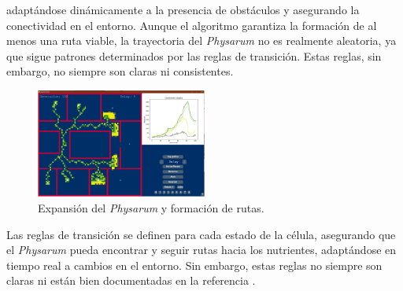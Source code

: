         adapt\'andose din\'amicamente a la presencia de obst\'aculos y asegurando la conectividad en el entorno. Aunque el 
        algoritmo garantiza la formaci\'on de al menos una ruta viable, la trayectoria del \textit{Physarum} no es 
        realmente aleatoria, ya que sigue patrones determinados por las reglas de transici\'on. Estas reglas, sin embargo,
        no siempre son claras ni consistentes.
    \vskip 0.5cm
    \begin{figure}[h]
        \centering
        \includegraphics[width=0.5\textwidth]{./images/estado_del_arte/physarum/expansionOlvera.png}
        \caption{Expansi\'on del \textit{Physarum} y formaci\'on de rutas. \cite{Olvera2023}}
        \label{fig:expansion}
    \end{figure}
    \vskip 0.5cm
    Las reglas de transici\'on se definen para cada estado de la c\'elula, 
        asegurando que el \textit{Physarum} pueda encontrar y seguir rutas hacia los nutrientes, 
        adapt\'andose en tiempo real a cambios en el entorno. Sin embargo, estas reglas no 
        siempre son claras ni est\'an bien documentadas en la referencia \cite{Olvera2023}.

